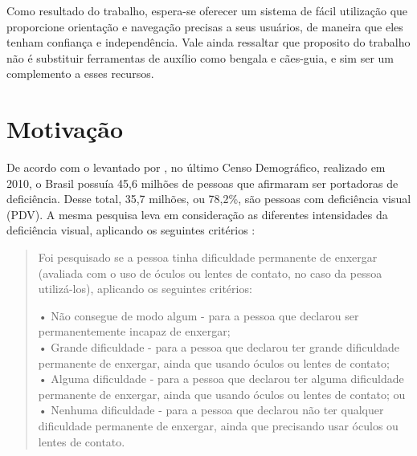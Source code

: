 \documentclass[english,brazilian]{UNISINOSmonografia}
\begin{document}
Como resultado do trabalho, espera-se oferecer um sistema de fácil utilização que proporcione orientação e navegação precisas a seus usuários, de maneira que eles tenham confiança e independência. Vale ainda ressaltar que proposito do trabalho não é substituir ferramentas de auxílio como bengala e cães-guia, e sim ser um complemento a esses recursos.

	\section{Motivação}


De acordo com o levantado por , no último Censo Demográfico, realizado em 2010, o Brasil possuía 45,6 milhões de pessoas que afirmaram ser portadoras de deficiência. Desse total, 35,7 milhões, ou 78,2\%, são pessoas com deficiência visual (PDV). A mesma pesquisa leva em consideração as diferentes intensidades da deficiência visual, aplicando os seguintes critérios \cite{IBGE2010}: 

\begin{quote}
	Foi pesquisado se a pessoa tinha dificuldade permanente de enxergar (avaliada com o uso de óculos ou lentes de contato, no caso da pessoa utilizá-los), aplicando os seguintes critérios:
		
	• Não consegue de modo algum - para a pessoa que declarou ser permanentemente incapaz de enxergar; \\
	• Grande dificuldade - para a pessoa que declarou ter grande dificuldade permanente de enxergar, ainda que usando óculos ou lentes de contato; \\
	• Alguma dificuldade - para a pessoa que declarou ter alguma dificuldade permanente de enxergar, ainda que usando óculos ou lentes de contato; ou \\
	• Nenhuma dificuldade - para a pessoa que declarou não ter qualquer dificuldade permanente de enxergar, ainda que precisando usar óculos ou lentes de contato.
\end{quote}
\end{document}
